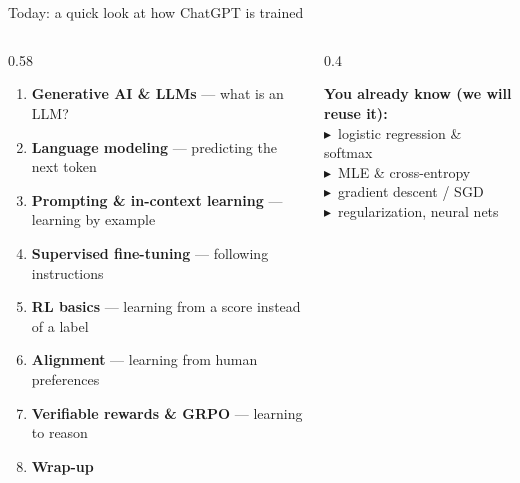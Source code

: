 \section{}
\begin{frame}[plain]
  \titlepage
\end{frame}

\begin{frame}{Today: a quick look at how ChatGPT is trained}
\newcommand{\agitem}{\textcolor{uvanavy}{\scriptsize$\blacktriangleright$}~}%
\begin{columns}[T]
\begin{column}{0.58\textwidth}
\small\setlength{\leftmargini}{1.4em}
\begin{enumerate}\setlength{\itemsep}{2pt}
  \item \textbf{Generative AI \& LLMs} --- what is an LLM?
  \item \textbf{Language modeling} --- predicting the next token
  \item \textbf{Prompting \& in-context learning} --- learning by example
  \item \textbf{Supervised fine-tuning} --- following instructions
  \item \textbf{RL basics} --- learning from a score instead of a label
  \item \textbf{Alignment} --- learning from human preferences
  \item \textbf{Verifiable rewards \& GRPO} --- learning to reason
  \item \textbf{Wrap-up}
\end{enumerate}
\end{column}
\begin{column}{0.4\textwidth}
\footnotesize
\begin{tcolorbox}[colback=uvaorange!7,colframe=uvaorange!75!black,boxrule=0.5pt,arc=2pt,left=5pt,right=5pt,top=2pt,bottom=2pt,before skip=0pt,after skip=5pt]
\textbf{\textcolor{uvaorange!80!black}{You already know (we will reuse it):}}\\[1pt]
\agitem logistic regression \& softmax\\
\agitem MLE \& cross-entropy\\
\agitem gradient descent / SGD\\
\agitem regularization, neural nets
\end{tcolorbox}
\begin{tcolorbox}[colback=uvanavy!5,colframe=uvanavy,boxrule=0.5pt,arc=2pt,left=5pt,right=5pt,top=2pt,bottom=2pt,before skip=0pt,after skip=0pt]

\end{tcolorbox}
\end{column}
\end{columns}
\end{frame}
